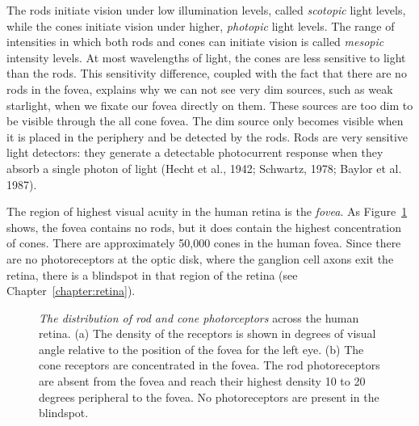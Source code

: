 The rods initiate vision under low illumination levels,
called {\em scotopic} light levels, while
the cones initiate vision
under higher, {\em photopic} light levels.
The range of intensities in which both
rods and cones can initiate vision
is called {\em mesopic} intensity levels.
At most wavelengths of light, the cones
are less sensitive to light than the rods.
This sensitivity difference, coupled with the fact that
there are no rods in the fovea,
explains why
we can not see very dim sources, such as weak starlight,
when we fixate our fovea directly on them.
These sources are too dim to be visible through the all cone fovea.
The dim source only becomes visible when it is placed in the
periphery and be detected by the rods.
Rods are very sensitive light detectors:
they generate a detectable photocurrent response when
they absorb a single photon of light (Hecht et al., 1942; Schwartz,
1978; Baylor et al. 1987).

The region of highest visual acuity in the human retina
is the {\em fovea}.
As Figure~\ref{f2:receptor.dens} shows, the fovea
contains no rods, but it does contain the highest
concentration of cones.
There are approximately 50,000 cones in the human fovea.
Since there are no photoreceptors at the optic disk,
where the ganglion cell axons exit the retina,
there is a blindspot in that region of the retina 
(see Chapter~\ref{chapter:retina}).
\begin{figure}
\centerline {
}
\caption[Rods and Cones]{
{\em The distribution of rod and cone photorceptors}
across the human retina.
(a) The density of the receptors is shown in degrees
of visual angle relative to the position of the fovea
for the left eye.
(b)  The cone receptors are concentrated in the fovea.
The rod photoreceptors are absent from the fovea and reach their
highest density 10 to 20 degrees peripheral to the fovea.
No photoreceptors are present in the blindspot.
}
\label{f2:receptor.dens}
\end{figure}

